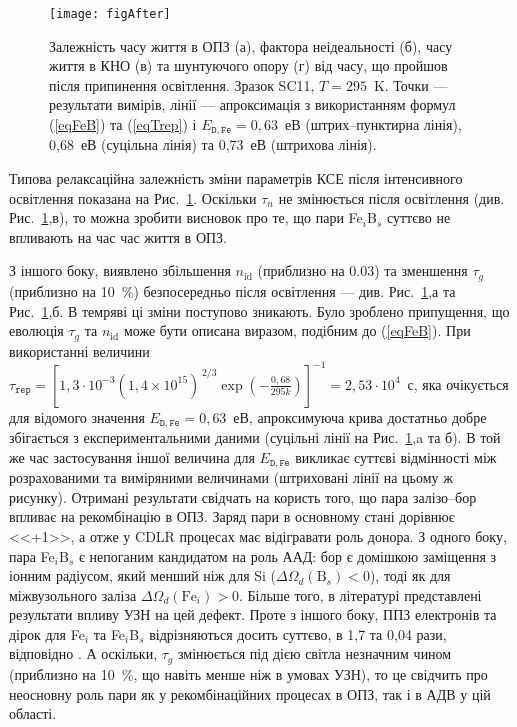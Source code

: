 \begin{figure}
\center
\texttt{[image: figAfter]}
\caption{\label{figAfter}
Залежність часу життя в ОПЗ (а),  фактора неідеальності (б), часу життя в КНО (в) та шунтуючого опору (г) від часу, що пройшов
після припинення освітлення.
Зразок SC11, $T=295$~K.
Точки --- результати вимірів,
лінії --- апроксимація з використанням формул (\ref{eqFeB}) та (\ref{eqTrep})
і $E_{\mathtt{D,Fe}}=0,63$~еВ (штрих--пунктирна лінія), 0,68~еВ (суцільна лінія) та 0,73~еВ (штрихова лінія).
}%
\end{figure}

Типова релаксаційна залежність зміни параметрів КСЕ після інтенсивного освітлення показана на Рис.~\ref{figAfter}.
Оскільки $\tau_n$ не змінюється після освітлення (див. Рис.~\ref{figAfter},в), то можна зробити висновок про те, що
пари Fe$_i$B$_s$ суттєво не впливають на час час життя в ОПЗ.

З іншого боку, виявлено збільшення $n_{\mathrm{id}}$ (приблизно на 0.03) та зменшення $\tau_g$ (приблизно на 10~\%) безпосередньо після освітлення
--- див. Рис.~\ref{figAfter},а та Рис.~\ref{figAfter},б.
В темряві ці зміни поступово зникають.
Було зроблено припущення, що еволюція $\tau_g$ та $n_{\mathrm{id}}$ може бути описана виразом, подібним до (\ref{eqFeB}).
При використанні величини $\tau_{\mathtt{rep}}=\left[1,3\cdot10^{-3}(1,4\times10^{15})^{\,2/3}\exp\left(-\frac{0,68}{295k}\right)\right]^{-1}=2,53\cdot10^4$~с,
яка очікується для відомого значення $E_{\mathtt{D,Fe}}=0,63$~еВ, апроксимуюча крива достатньо добре збігається з експериментальними даними
(суцільні лінії на Рис.~\ref{figAfter},a та б).
В той же час застосування іншої величина для $E_{\mathtt{D,Fe}}$ викликає суттєві відмінності між розрахованими та виміряними величинами
(штриховані лінії на цьому ж рисунку).
Отримані результати свідчать на користь того, що пара залізо--бор впливає
на рекомбінацію в ОПЗ.
Заряд пари в основному стані дорівнює <<+1>>, а отже у CDLR процесах має відігравати роль донора.
З одного боку, пара Fe$_i$B$_s$ є непоганим кандидатом на роль ААД:
бор є домішкою заміщення з іонним радіусом, який менший ніж для Si ($\Delta\Omega_d (\mbox{B}_s)<0$),
тоді як для міжвузольного заліза $\Delta\Omega_d (\mbox{Fe}_i)>0$.
Більше того,  в літературі \cite{Ostapenko1995,OlikhFTT} представлені результати впливу УЗН на цей дефект.
Проте з іншого боку, ППЗ електронів та дірок для Fe$_i$ та Fe$_i$B$_s$ відрізняються досить суттєво, в 1,7 та 0,04 рази, відповідно \cite{MurphyJAP2011}.
А оскільки, $\tau_g$ змінюється під дією світла незначним чином (приблизно на 10~\%, що навіть менше ніж в умовах УЗН), то це свідчить про
неосновну роль пари як у рекомбінаційних процесах в ОПЗ, так і в АДВ у цій області.


